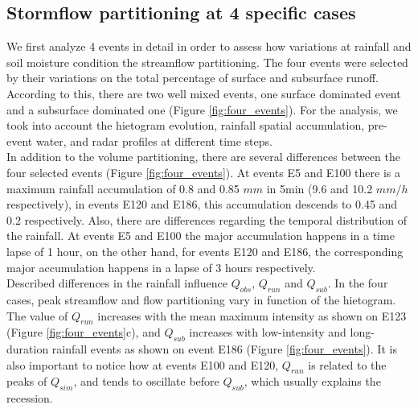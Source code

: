 \documentclass[preprint,12pt]{elsarticle}
\begin{document}
\subsection{Stormflow partitioning at 4 specific cases } \label{sec:4Cases}

We first analyze 4 events in detail in order to assess how variations at rainfall and soil moisture condition the streamflow partitioning. The four events were selected by their variations on the total percentage of surface and subsurface runoff.  According to this, there are two well mixed events, one surface dominated event and a subsurface dominated one (Figure \ref{fig:four_events}). For the analysis, we took into account the hietogram evolution, rainfall spatial accumulation, pre-event water, and radar profiles at different time steps.\\

In addition to the volume partitioning, there are several differences between the four selected events (Figure \ref{fig:four_events}).  At events E5 and E100 there is a maximum rainfall accumulation of 0.8 and 0.85 $mm$ in 5min (9.6 and 10.2 $mm/h$ respectively), in events E120 and E186, this accumulation descends to 0.45 and 0.2 respectively.   Also, there are differences regarding the temporal distribution of the rainfall.  At events E5 and E100 the major accumulation happens in a time lapse of 1 hour,  on the other hand, for events E120 and E186, the corresponding major accumulation happens in a lapse of  3 hours respectively.\\

Described differences in the rainfall influence $Q_{obs}$, $Q_{run}$ and $Q_{sub}$.  In the four cases, peak streamflow and flow partitioning vary in function of the hietogram.  The value of $Q_{run}$ increases with the mean maximum intensity as shown on E123 (Figure \ref{fig:four_events}c), and $Q_{sub}$ increases with low-intensity and long-duration rainfall events as shown on event E186 (Figure \ref{fig:four_events}).  It is also important to notice how at events E100 and E120, $Q_{run}$ is related to the peaks of $Q_{sim}$, and tends to oscillate before $Q_{sub}$, which usually explains the recession. \\
\end{document}
